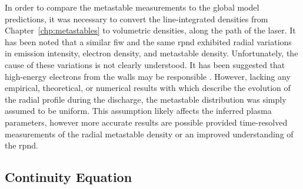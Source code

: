 In order to compare the metastable measurements to the global model predictions,
it was necessary to convert the line-integrated densities from
Chapter~\ref{chp:metastables} to volumetric densities, along the path of the
laser. It has been noted that a similar \acs{fiw} \cite{Vasilyak1994} and the
same \acs{rpnd} \cite{Weatherford2012} exhibited radial variations in emission
intensity, electron density, and metastable density. Unfortunately, the cause of
these variations is not clearly understood. It has been suggested that
high-energy electrons from the walls may be responsible \cite{Weatherford2012a}.
However, lacking any empirical, theoretical, or numerical results with which
describe the evolution of the radial profile during the discharge, the
metastable distribution was simply assumed to be uniform. This assumption likely
affects the inferred plasma parameters, however more accurate results are
possible provided time-resolved measurements of the radial metastable density or
an improved understanding of the \acs{rpnd}.

\subsection{Continuity Equation}

